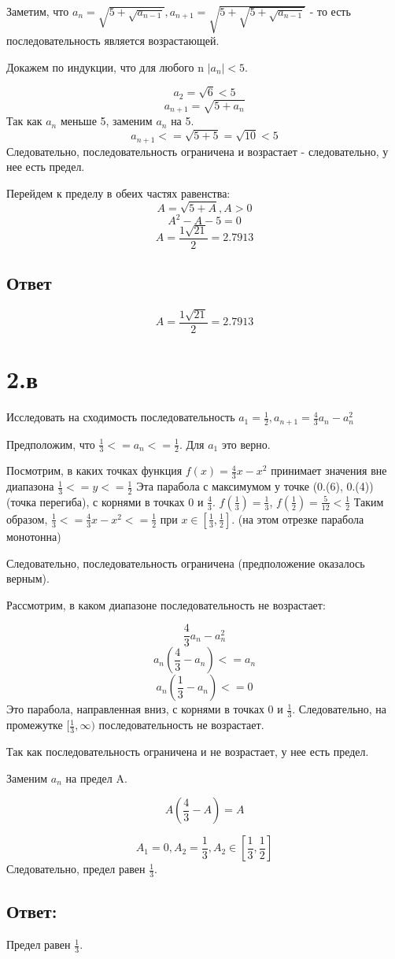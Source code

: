 \documentclass[a4paper]{article}
\begin{document}
Заметим, что $a_n = \sqrt{5 + \sqrt{a_{n - 1}}}, a_{n+1} = \sqrt{5 + \sqrt{5 +\sqrt{a_{n - 1}}}}$ - то есть последовательность является возрастающей.

Докажем по индукции, что для любого n $|a_n| < 5$.

$$a_2 = \sqrt{6} < 5$$
$$a_{n + 1} = \sqrt{5 + a_n}$$
Так как $a_n$ меньше 5, заменим $a_n$ на 5.
$$a_{n + 1} <= \sqrt{5 + 5} = \sqrt{10} < 5$$
Следовательно, последовательность ограничена и возрастает - следовательно, у нее есть предел.

Перейдем к пределу в обеих частях равенства:
$$A = \sqrt{5 + A}, A > 0$$
$$A^2 - A - 5 = 0$$
$$A = \frac{1 \sqrt{21}}{2} = 2.7913$$
\subsection*{Ответ}
$$A = \frac{1 \sqrt{21}}{2} = 2.7913$$







\section*{2.в}
Исследовать на сходимость последовательность $ a_1 = \frac{1}{2}, a_{n+1}  = \frac{4}{3}a_n - a^2_n$


Предположим, что $ \frac{1}{3} <= a_n <= \frac{1}{2}$. Для $a_1$ это верно.

Посмотрим, в каких точках функция $f(x) = \frac{4}{3}x - x^2$ принимает значения вне диапазона $ \frac{1}{3} <= y <= \frac{1}{2}$
Эта парабола с максимумом у точке (0.(6), 0.(4))(точка перегиба), с корнями в точках 0 и $\frac{4}{3}$.
$f(\frac{1}{3}) = \frac{1}{3}$, $f(\frac{1}{2}) = \frac{5}{12} < \frac{1}{2}$ Таким образом, $ \frac{1}{3} <= \frac{4}{3}x - x^2 <= \frac{1}{2}$ при $ x \in [\frac{1}{3}, \frac{1}{2}]$. (на этом отрезке парабола монотонна)

Следовательно, последовательность ограничена (предположение оказалось верным).

Рассмотрим, в каком диапазоне последовательность не возрастает:

$$\frac{4}{3}a_n - a^2_n$$
$$a_n(\frac{4}{3} - a_n) <= a_n$$
$$a_n(\frac{1}{3} - a_n) <= 0$$
Это парабола, направленная вниз, с корнями в точках 0 и $\frac{1}{3}$. Следовательно, на промежутке $[\frac{1}{3}, \infty)$ последовательность не возрастает.


Так как последовательность ограничена и не возрастает, у нее есть предел.

Заменим $a_n$  на предел A.

$$A(\frac{4}{3} - A) = A$$

$$ A_1 = 0, A_2 = \frac{1}{3}, A_2 \in [\frac{1}{3}, \frac{1}{2}]$$
Следовательно, предел равен $\frac{1}{3}$.
\subsection*{Ответ:}
Предел равен $\frac{1}{3}$.
\end{document}
